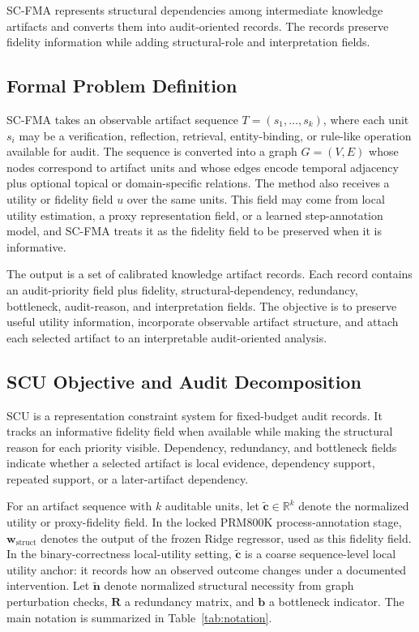 \documentclass[pdflatex,sn-mathphys-num,iicol]{sn-jnl}
\newcommand{\wstruct}{\ensuremath{\mathbf{w}_{\mathrm{struct}}}}
\begin{document}
SC-FMA represents structural dependencies among intermediate knowledge artifacts and converts them into audit-oriented records. The records preserve fidelity information while adding structural-role and interpretation fields.

\subsection{Formal Problem Definition}

SC-FMA takes an observable artifact sequence $T=(s_1,\ldots,s_k)$, where each unit $s_i$ may be a verification, reflection, retrieval, entity-binding, or rule-like operation available for audit. The sequence is converted into a graph $G=(V,E)$ whose nodes correspond to artifact units and whose edges encode temporal adjacency plus optional topical or domain-specific relations. The method also receives a utility or fidelity field $u$ over the same units. This field may come from local utility estimation, a proxy representation field, or a learned step-annotation model, and SC-FMA treats it as the fidelity field to be preserved when it is informative.

The output is a set of calibrated knowledge artifact records. Each record contains an audit-priority field plus fidelity, structural-dependency, redundancy, bottleneck, audit-reason, and interpretation fields. The objective is to preserve useful utility information, incorporate observable artifact structure, and attach each selected artifact to an interpretable audit-oriented analysis.

\subsection{SCU Objective and Audit Decomposition}
\label{sec:scu-objective}

SCU is a representation constraint system for fixed-budget audit records. It tracks an informative fidelity field when available while making the structural reason for each priority visible. Dependency, redundancy, and bottleneck fields indicate whether a selected artifact is local evidence, dependency support, repeated support, or a later-artifact dependency.

For an artifact sequence with $k$ auditable units, let $\tilde{\mathbf{c}}\in\mathbb{R}^k$ denote the normalized utility or proxy-fidelity field. In the locked PRM800K process-annotation stage, \wstruct{} denotes the output of the frozen Ridge regressor, used as this fidelity field. In the binary-correctness local-utility setting, $\tilde{\mathbf{c}}$ is a coarse sequence-level local utility anchor: it records how an observed outcome changes under a documented intervention. Let $\tilde{\mathbf{n}}$ denote normalized structural necessity from graph perturbation checks, $\mathbf{R}$ a redundancy matrix, and $\mathbf{b}$ a bottleneck indicator. The main notation is summarized in Table~\ref{tab:notation}.
\end{document}
